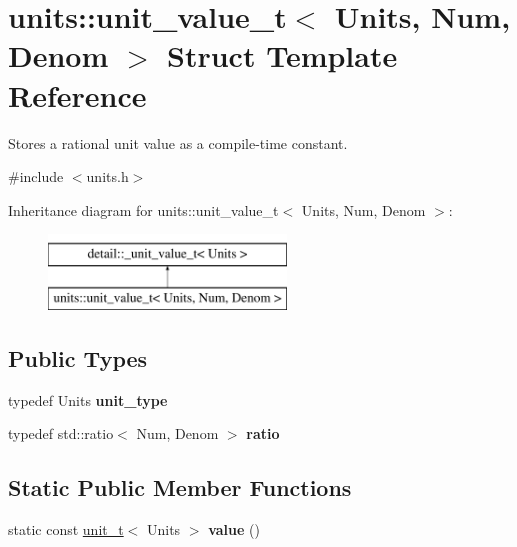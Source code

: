 \hypertarget{structunits_1_1unit__value__t}{}\section{units\+:\+:unit\+\_\+value\+\_\+t$<$ Units, Num, Denom $>$ Struct Template Reference}
\label{structunits_1_1unit__value__t}


Stores a rational unit value as a compile-\/time constant.  




{\ttfamily \#include $<$units.\+h$>$}

Inheritance diagram for units\+:\+:unit\+\_\+value\+\_\+t$<$ Units, Num, Denom $>$\+:\begin{figure}[H]
\begin{center}
\leavevmode
\includegraphics[height=2.000000cm]{structunits_1_1unit__value__t}
\end{center}
\end{figure}
\subsection*{Public Types}
\begin{DoxyCompactItemize}
\item 
\hypertarget{structunits_1_1unit__value__t_a075e5bcccba668f3852a25f88e13a2a7}{}typedef Units {\bfseries unit\+\_\+type}\label{structunits_1_1unit__value__t_a075e5bcccba668f3852a25f88e13a2a7}

\item 
\hypertarget{structunits_1_1unit__value__t_a3a2686045bb6ac0c42b6045fa8060fa5}{}typedef std\+::ratio$<$ Num, Denom $>$ {\bfseries ratio}\label{structunits_1_1unit__value__t_a3a2686045bb6ac0c42b6045fa8060fa5}

\end{DoxyCompactItemize}
\subsection*{Static Public Member Functions}
\begin{DoxyCompactItemize}
\item 
\hypertarget{structunits_1_1unit__value__t_ae6c20c2baf2a9509d1e1c345ec290e3a}{}static const \hyperlink{classunits_1_1unit__t}{unit\+\_\+t}$<$ Units $>$ {\bfseries value} ()\label{structunits_1_1unit__value__t_ae6c20c2baf2a9509d1e1c345ec290e3a}

\end{DoxyCompactItemize}


